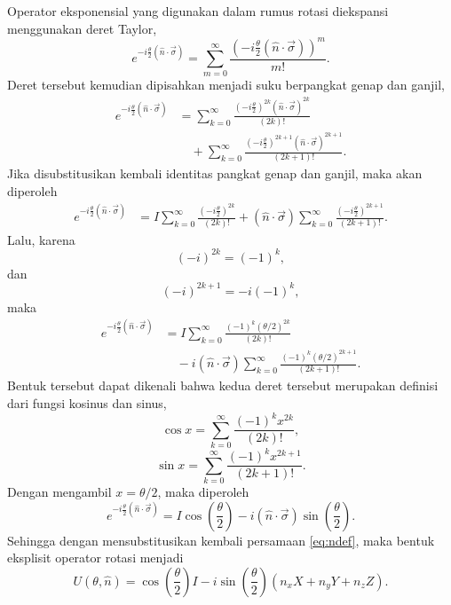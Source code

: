 Operator eksponensial yang digunakan dalam rumus rotasi diekspansi menggunakan deret Taylor,
\begin{equation}
e^{-i\frac{\theta}{2}(\hat{n}\cdot\vec{\sigma})}
=
\sum_{m=0}^{\infty}
\frac{\left(-i\frac{\theta}{2}(\hat{n}\cdot\vec{\sigma})\right)^m}{m!}.
\end{equation}
Deret tersebut kemudian dipisahkan menjadi suku berpangkat genap dan ganjil,
\begin{equation}
\begin{aligned}
e^{-i\frac{\theta}{2}(\hat{n}\cdot\vec{\sigma})}
&=
\sum_{k=0}^{\infty}
\frac{\left(-i\frac{\theta}{2}\right)^{2k}
(\hat{n}\cdot\vec{\sigma})^{2k}}
{(2k)!} \\
&\quad+
\sum_{k=0}^{\infty}
\frac{\left(-i\frac{\theta}{2}\right)^{2k+1}
(\hat{n}\cdot\vec{\sigma})^{2k+1}}
{(2k+1)!}.
\end{aligned}
\end{equation}
Jika disubstitusikan kembali identitas pangkat genap dan ganjil, maka akan diperoleh
\begin{equation}
\begin{aligned}
e^{-i\frac{\theta}{2}(\hat{n}\cdot\vec{\sigma})}
&=
I
\sum_{k=0}^{\infty}
\frac{\left(-i\frac{\theta}{2}\right)^{2k}}
{(2k)!}
+
(\hat{n}\cdot\vec{\sigma})
\sum_{k=0}^{\infty}
\frac{\left(-i\frac{\theta}{2}\right)^{2k+1}}
{(2k+1)!}.
\end{aligned}
\end{equation}
Lalu, karena
\begin{equation}
(-i)^{2k}=(-1)^k,
\end{equation}
dan
\begin{equation}
(-i)^{2k+1}
=
-i(-1)^k,
\end{equation}
maka
\begin{equation}
\begin{aligned}
e^{-i\frac{\theta}{2}(\hat{n}\cdot\vec{\sigma})}
&=
I
\sum_{k=0}^{\infty}
\frac{(-1)^k(\theta/2)^{2k}}
{(2k)!} \\
&\quad
-i(\hat{n}\cdot\vec{\sigma})
\sum_{k=0}^{\infty}
\frac{(-1)^k(\theta/2)^{2k+1}}
{(2k+1)!}.
\end{aligned}
\end{equation}
Bentuk tersebut dapat dikenali bahwa kedua deret tersebut merupakan definisi dari fungsi kosinus dan sinus,
\begin{equation}
\cos x
=
\sum_{k=0}^{\infty}
\frac{(-1)^k x^{2k}}
{(2k)!},
\end{equation}
\begin{equation}
\sin x
=
\sum_{k=0}^{\infty}
\frac{(-1)^k x^{2k+1}}
{(2k+1)!}.
\end{equation}
Dengan mengambil $x=\theta/2$, maka diperoleh
\begin{equation}
e^{-i\frac{\theta}{2}(\hat{n}\cdot\vec{\sigma})}
=
I
\cos\left(\frac{\theta}{2}\right)
-
i(\hat{n}\cdot\vec{\sigma})
\sin\left(\frac{\theta}{2}\right).
\end{equation}
Sehingga dengan mensubstitusikan kembali persamaan \eqref{eq:ndef}, maka bentuk eksplisit operator rotasi menjadi
\begin{equation}
U(\theta,\hat{n})
=
\cos\left(\frac{\theta}{2}\right)I
-
i\sin\left(\frac{\theta}{2}\right)
\left(n_xX+n_yY+n_zZ\right).
\end{equation}